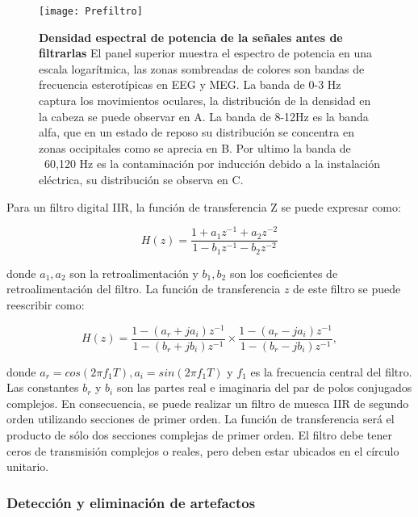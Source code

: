 \documentclass[11pt,letterpaper]{article}
\numberwithin{equation}{subsection}
\numberwithin{table}{subsection}
\begin{document}
\begin{figure}[H]
\centering
	\texttt{[image: Prefiltro]}
	\captionsetup{labelfont=bf}
	\caption{\scriptsize \textbf{Densidad espectral de potencia de la señales antes de filtrarlas} El panel superior muestra el espectro de potencia en una escala logarítmica, las zonas sombreadas de colores son bandas de frecuencia esterotípicas en  EEG y MEG. La banda de 0-3 Hz captura los movimientos oculares, la distribución de la densidad en la cabeza se puede observar en A. La banda de 8-12Hz es la banda alfa, que en un estado de reposo su distribución se concentra en zonas occipitales como se aprecia en B. Por ultimo la banda de ~60,120 Hz es la contaminación por inducción debido a la instalación eléctrica, su distribución se observa en C.}
	\label{fig:Fig14}
\end{figure}

\bigskip
\noindent Para un filtro digital IIR, la función de transferencia Z se puede expresar como:

\begin{equation}
H(z) = \frac{1+a_1z^{-1}+a_2z^{-2}}{1-b_1z^{-1}-b_2z^{-2}}
\end{equation}

\smallskip
\noindent donde $a_1,a_2$ son la retroalimentación y $b_1, b_2$ son los coeficientes de retroalimentación del filtro. La función de transferencia $z$ de este filtro se puede reescribir como:

\begin{equation}
H(z) = \frac{1-(a_r+ja_i)z^{-1}}{1-(b_r+jb_i)z^{-1}} \times \frac{1-(a_r-ja_i)z^{-1}}{1-(b_r-jb_i)z^{-1}},
\end{equation}

\smallskip
\noindent donde $a_r=cos(2\pi f_1T), a_i=sin(2\pi f_1T)$ y $f_1$ es la frecuencia central del filtro. Las constantes $b_r$ y $b_i$ son las partes real e imaginaria del par de polos conjugados complejos. En consecuencia, se puede realizar un filtro de muesca IIR de segundo orden utilizando secciones de primer orden. La función de transferencia será el producto de sólo dos secciones complejas de primer orden. El filtro debe tener ceros de transmisión complejos o reales, pero deben estar ubicados en el círculo unitario.
\subsubsection{Detección y eliminación de artefactos}
\end{document}
